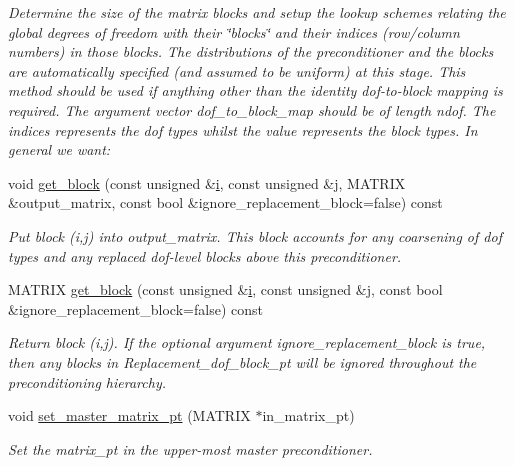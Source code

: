 \begin{DoxyCompactItemize}
\begin{DoxyCompactList}\small\item\em Determine the size of the matrix blocks and setup the lookup schemes relating the global degrees of freedom with their \char`\"{}blocks\char`\"{} and their indices (row/column numbers) in those blocks. The distributions of the preconditioner and the blocks are automatically specified (and assumed to be uniform) at this stage. This method should be used if anything other than the identity dof-\/to-\/block mapping is required. The argument vector dof\+\_\+to\+\_\+block\+\_\+map should be of length ndof. The indices represents the dof types whilst the value represents the block types. In general we want\+: \end{DoxyCompactList}\item 
void \hyperlink{classoomph_1_1BlockPreconditioner_a72b4dbe167da59d9ba12c7eff97d77e6}{get\+\_\+block} (const unsigned \&\hyperlink{cfortran_8h_adb50e893b86b3e55e751a42eab3cba82}{i}, const unsigned \&j, M\+A\+T\+R\+IX \&output\+\_\+matrix, const bool \&ignore\+\_\+replacement\+\_\+block=false) const
\begin{DoxyCompactList}\small\item\em Put block (i,j) into output\+\_\+matrix. This block accounts for any coarsening of dof types and any replaced dof-\/level blocks above this preconditioner. \end{DoxyCompactList}\item 
M\+A\+T\+R\+IX \hyperlink{classoomph_1_1BlockPreconditioner_a4c37f469646c689b5f1e79d0953bd588}{get\+\_\+block} (const unsigned \&\hyperlink{cfortran_8h_adb50e893b86b3e55e751a42eab3cba82}{i}, const unsigned \&j, const bool \&ignore\+\_\+replacement\+\_\+block=false) const
\begin{DoxyCompactList}\small\item\em Return block (i,j). If the optional argument ignore\+\_\+replacement\+\_\+block is true, then any blocks in Replacement\+\_\+dof\+\_\+block\+\_\+pt will be ignored throughout the preconditioning hierarchy. \end{DoxyCompactList}\item 
void \hyperlink{classoomph_1_1BlockPreconditioner_a748e2ad8836bc8edf5b9a42373a7ad61}{set\+\_\+master\+\_\+matrix\+\_\+pt} (M\+A\+T\+R\+IX $\ast$in\+\_\+matrix\+\_\+pt)
\begin{DoxyCompactList}\small\item\em Set the matrix\+\_\+pt in the upper-\/most master preconditioner. \end{DoxyCompactList}\item 

\end{DoxyCompactItemize}
